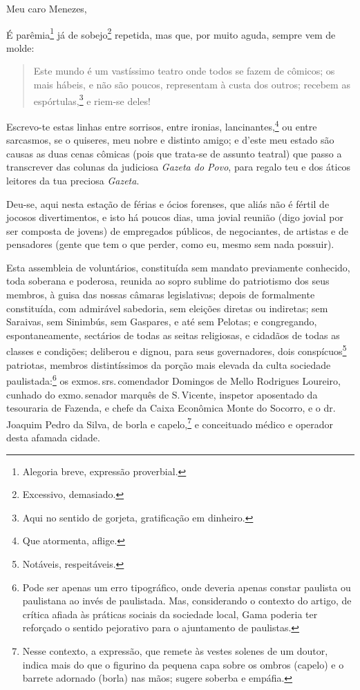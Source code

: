 Meu caro Menezes,

É parêmia\footnote{Alegoria breve, expressão proverbial.} já de
sobejo\footnote{Excessivo, demasiado.} repetida, mas que, por muito
aguda, sempre vem de molde:

\begin{quote}
Este mundo é um vastíssimo teatro onde todos se fazem de cômicos; os
mais hábeis, e não são poucos, representam à custa dos outros; recebem
as espórtulas,\footnote{Aqui no sentido de gorjeta, gratificação em
  dinheiro.} e riem-se deles!
\end{quote}

Escrevo-te estas linhas entre sorrisos, entre ironias,
lancinantes,\footnote{Que atormenta, aflige.} ou entre sarcasmos, se o
quiseres, meu nobre e distinto amigo; e d'este meu estado são
causas as duas cenas cômicas (pois que trata-se de assunto
teatral) que passo a transcrever das colunas da judiciosa \emph{Gazeta
do Povo}, para regalo teu e dos áticos leitores da tua preciosa
\emph{Gazeta}.

Deu-se, aqui nesta estação de férias e ócios forenses, que aliás não é
fértil de jocosos divertimentos, e isto há poucos dias, uma jovial
reunião (digo jovial por ser composta de jovens) de empregados públicos,
de negociantes, de artistas e de pensadores (gente que tem o que
perder, como eu, mesmo sem nada possuir).

Esta assembleia de voluntários, constituída sem mandato previamente
conhecido, toda soberana e poderosa, reunida ao sopro sublime do
patriotismo dos seus membros, à guisa das nossas câmaras legislativas;
depois de formalmente constituída, com admirável sabedoria, sem eleições
diretas ou indiretas; sem Saraivas, sem Sinimbús, sem Gaspares, e até
sem Pelotas; e congregando, espontaneamente, sectários de todas as seitas
religiosas, e cidadãos de todas as classes e condições; deliberou e
dignou, para seus governadores, dois conspícuos\footnote{Notáveis,
  respeitáveis.} patriotas, membros distintíssimos da porção mais
elevada da culta sociedade paulistada:\footnote{Pode ser apenas um erro
  tipográfico, onde deveria apenas constar paulista ou paulistana ao
  invés de paulistada. Mas, considerando o contexto do artigo, de
  crítica afiada às práticas sociais da sociedade local, Gama poderia
  ter reforçado o sentido pejorativo para o ajuntamento de paulistas.}
os exmos.\,srs.\,comendador Domingos de Mello Rodrigues Loureiro, cunhado
do exmo.\,senador marquês de S.\,Vicente, inspetor aposentado da
tesouraria de Fazenda, e chefe da Caixa Econômica Monte do Socorro, e o
dr.\,Joaquim Pedro da Silva, de borla e capelo,\footnote{Nesse contexto, a expressão, que
  remete às vestes solenes de um doutor, indica mais do
  que o figurino da pequena capa sobre os ombros (capelo) e o barrete
  adornado (borla) nas mãos; sugere soberba e empáfia.} e conceituado
médico e operador desta afamada cidade.

